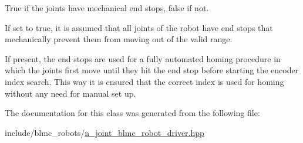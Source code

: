 True if the joints have mechanical end stops, false if not. 

If set to true, it is assumed that all joints of the robot have end stops that mechanically prevent them from moving out of the valid range.

If present, the end stops are used for a fully automated homing procedure in which the joints first move until they hit the end stop before starting the encoder index search. This way it is ensured that the correct index is used for homing without any need for manual set up. 

The documentation for this class was generated from the following file\+:\begin{DoxyCompactItemize}
\item 
include/blmc\+\_\+robots/\hyperlink{n__joint__blmc__robot__driver_8hpp}{n\+\_\+joint\+\_\+blmc\+\_\+robot\+\_\+driver.\+hpp}\end{DoxyCompactItemize}
